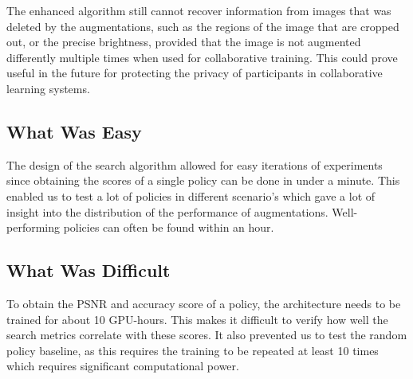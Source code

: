 The enhanced algorithm still cannot recover information from images that was deleted by the augmentations, such as the regions of the image that are cropped out, or the precise brightness, provided that the image is not augmented differently multiple times when used for collaborative training. This could prove useful in the future for protecting the privacy of participants in collaborative learning systems.




\subsection{What Was Easy}
The design of the search algorithm allowed for easy iterations of experiments since obtaining the scores of a single policy can be done in under a minute. This enabled us to test a lot of policies in different scenario's which gave a lot of insight into the distribution of the performance of augmentations. Well-performing policies can often be found within an hour.

\subsection{What Was Difficult}

To obtain the PSNR and accuracy score of a policy, the architecture needs to be trained for about 10 GPU-hours. This makes it difficult to verify how well the search metrics correlate with these scores. It also prevented us to test the random policy baseline, as this requires the training to be repeated at least 10 times which requires significant computational power.


